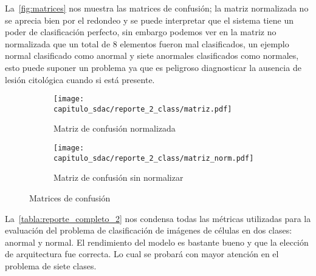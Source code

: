 \begin{table}[H]
    \centering
    \caption{Reporte de clasificación binario}
    \label{tabla:reporte_2}
    \end{table}

La~\autoref{fig:matrices} nos muestra las matrices de confusión; la matriz
normalizada no se aprecia bien por el redondeo y se puede interpretar que el
sistema tiene un poder de clasificación perfecto, sin embargo podemos ver en la
matriz no normalizada que un total de 8 elementos fueron mal clasificados, un
ejemplo normal clasificado como anormal y siete anormales clasificados como
normales, esto puede suponer un problema ya que es peligroso diagnosticar la
ausencia de lesión citológica cuando si está presente.

\begin{figure}[H]
    \centering
    \begin{subfigure}[b]{0.6\textwidth}
        \centering 
        \texttt{[image: capitulo\_sdac/reporte\_2\_class/matriz.pdf]}
        \caption{Matriz de confusión normalizada}\label{fig:matriz_norm}
        \end{subfigure}
    \begin{subfigure}[b]{0.6\textwidth}
        \centering 
        \texttt{[image: capitulo\_sdac/reporte\_2\_class/matriz\_norm.pdf]}
        \caption{Matriz de confusión sin normalizar}\label{fig:matriz_sin}
    \end{subfigure}%
        \caption{Matrices de confusión} 
        \label{fig:matrices}
\end{figure}
    
La~\autoref{tabla:reporte_completo_2} nos condensa todas las métricas utilizadas
para la evaluación del problema de clasificación de imágenes de células en dos
clases: anormal y normal. El rendimiento del modelo es bastante bueno y que la
elección de arquitectura fue correcta. Lo cual se probará con mayor atención en
el problema de siete clases. 

